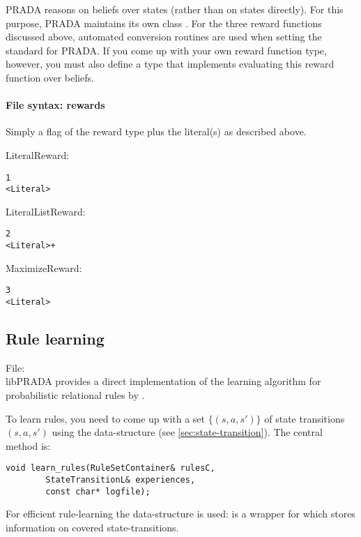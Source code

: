 \documentclass[10pt,twoside,twocolumn,fleqn]{article}
\begin{document}
PRADA reasons on beliefs over states (rather than on states directly). For
this purpose, PRADA maintains its own class . For the
three reward functions discussed above, automated conversion routines are
used when setting the standard  for PRADA. If you come up with
your own reward function type, however, you must also define a
 type that implements evaluating this reward function
over beliefs.


\paragraph{File syntax: rewards}

Simply a flag of the reward type plus the literal(s) as described above.

LiteralReward:
\begin{lstlisting}
1
<Literal>
\end{lstlisting}

LiteralListReward:
\begin{lstlisting}
2
<Literal>+
\end{lstlisting}

MaximizeReward:
\begin{lstlisting}
3
<Literal>
\end{lstlisting}







\subsection{Rule learning}

File: \\

libPRADA provides a direct implementation of the learning algorithm for
probabilistic relational rules by \citet{pasula07ai}.

To learn rules, you need to come up with a set $\{(s,a,s')\}$ of state
transitions $(s,a,s')$ using the data-structure  (see
\ref{sec:state-transition}). The central method is:
\begin{lstlisting}
void learn_rules(RuleSetContainer& rulesC,
		StateTransitionL& experiences,
		const char* logfile);
\end{lstlisting}
For efficient rule-learning the data-structure  is
used:  is a wrapper for  which stores
information on covered state-transitions.
\end{document}
